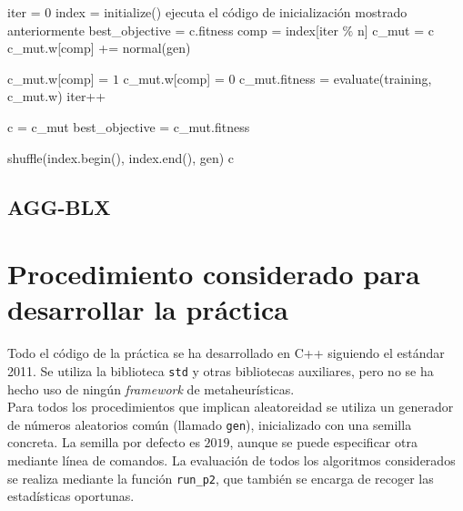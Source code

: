 \documentclass[12pt]{article}
\begin{document}
\begin{algorithm}[h!]
\begin{algorithmic}

    \State iter = 0
    \State index = initialize() \Comment ejecuta el código de inicialización mostrado anteriormente
    \State best\_objective = c.fitness
      
        \State comp = index[iter $\%$ n]
        \State c\_mut = c
        \State c\_mut.w[comp] += normal(gen)
        
         \State c\_mut.w[comp] = $1$
         \State c\_mut.w[comp] = $0$
        \EndIf
        \State c\_mut.fitness = evaluate(training, c\_mut.w)
        \State iter++

          \State c = c\_mut
          \State best\_objective = c\_mut.fitness
        \EndIf

          \State shuffle(index.begin(), index.end(), gen)
        \EndIf
     \EndWhile
\State \Return c
\EndFunction

\end{algorithmic}
\end{algorithm}

\subsection*{AGG-BLX}
\label{agg-blx}

\newpage
\section{Procedimiento considerado para desarrollar la práctica}

Todo el código de la práctica se ha desarrollado en C++ siguiendo el estándar 2011. Se utiliza la biblioteca \verb|std| y otras bibliotecas auxiliares, pero no se ha hecho uso de ningún \textit{framework} de metaheurísticas.\\

Para todos los procedimientos que implican aleatoreidad se utiliza un generador de números aleatorios común (llamado \verb|gen|), inicializado con una semilla concreta. La semilla por defecto es $2019$, aunque se puede especificar otra mediante línea de comandos. La evaluación de todos los algoritmos considerados se realiza mediante la función \verb|run_p2|, que también se encarga de recoger las estadísticas oportunas.\\
\end{document}
